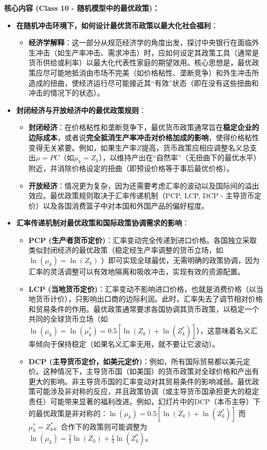 \documentclass[12pt]{article}
\begin{document}
\textbf{核心内容 (Class 10 - 随机模型中的最优政策)：}
\begin{itemize}
    \item \textbf{在随机冲击环境下，如何设计最优货币政策以最大化社会福利}：
    \begin{itemize}
        \item \textbf{经济学解释}：这一部分从规范经济学的角度出发，探讨中央银行在面临外生冲击（如生产率冲击、需求冲击）时，应如何设定其政策工具（通常是货币供给或利率）以最大化代表性家庭的期望效用。核心思想是，最优政策应尽可能地抵消由市场不完美（如价格粘性、垄断竞争）和外生冲击所造成的扭曲，使经济运行尽可能接近其“有效”状态（即在没有这些扭曲和冲击的情况下的状态）。
    \end{itemize}
    \item \textbf{封闭经济与开放经济中的最优政策规则}：
    \begin{itemize}
        \item \textbf{封闭经济}：在价格粘性和垄断竞争下，最优货币政策通常旨在\textbf{稳定企业的边际成本}，或者说\textbf{完全抵消生产率冲击对价格加成的影响}，使得价格粘性变得无关紧要。例如，如果生产率$Z$提高，货币政策应相应调整名义总支出$\mu=PC$（如$\mu_k=Z_k$），以维持产出在“自然率”（无扭曲下的最优水平）附近，并消除价格设定的扭曲（即预设价格等于事后最优价格）。
        \item \textbf{开放经济}：情况更为复杂，因为还需要考虑汇率的波动以及国际间的溢出效应。最优政策规则取决于汇率传递机制（PCP, LCP, DCP - 主导货币定价）以及各国消费篮子中对本国和外国产品的偏好程度。
    \end{itemize}
    \item \textbf{汇率传递机制对最优政策和国际政策协调需求的影响}：
    \begin{itemize}
        \item \textbf{PCP (生产者货币定价)}：汇率变动完全传递到进口价格。各国独立采取类似封闭经济的最优政策（稳定经生产率调整的货币立场，如$\ln(\mu_k) = \ln(Z_k)$ \cite{1082}）即可实现全球最优，无需明确的政策协调，因为汇率的灵活调整可以有效地隔离和吸收冲击，实现有效的资源配置。
        \item \textbf{LCP (当地货币定价)}：汇率变动不影响进口价格，也就是消费价格（以当地货币计价），只影响出口商的边际利润。此时，汇率失去了调节相对价格和贸易条件的作用。最优政策通常要求各国协调其货币政策，以稳定一个共同的全球货币立场（如$\ln(\mu_k) = \ln(\mu_k^*) = 0.5[\ln(Z_k) + \ln(Z_k^*)]$），这意味着名义汇率倾向于保持稳定（如果名义汇率无用，就不要让它波动）。
        \item \textbf{DCP (主导货币定价，如美元定价)}：例如，所有国际贸易都以美元定价。这种情况下，主导货币国（如美国）的货币政策对全球价格和产出有更大的影响。非主导货币国的汇率变动对其贸易条件的影响减弱。最优政策可能涉及非对称的反应，并且政策协调（或主导货币国承担更大的稳定责任）可能带来显著的福利改进。例如，幻灯片中的DCP（本币主导）下的最优政策是非对称的：$\ln(\mu_k) = 0.5[\ln(Z_k) + \ln(Z_k^*)]$ 而$\mu_k^* = Z_k^*$。合作下的政策则可能调整为$\ln(\mu_k) = \frac{2}{3}\ln(Z_k) + \frac{1}{3}\ln(Z_k^*)$。

\end{itemize}
\end{itemize}
\end{document}

